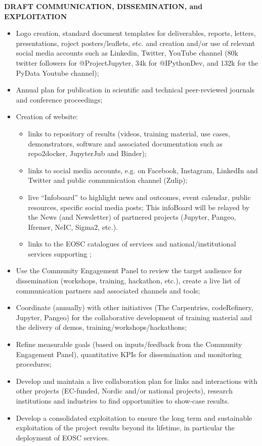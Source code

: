 \begin{framed}

  \centerline{\textbf{ \TheProject DRAFT COMMUNICATION, DISSEMINATION, and EXPLOITATION}}
  {
  \begin{itemize}

\item Logo creation, standard document templates for deliverables, reports, letters, presentations, roject posters/leaflets, etc. and creation and/or use of relevant social media accounts such as Linkedin, Twitter, YouTube channel (80k twitter followers for @ProjectJupyter, 34k for @IPythonDev, and 132k for the PyData Youtube channel);
\item Annual plan for publication in scientific and technical peer-reviewed journals and conference proceedings;
\item Creation of \TheProject website:
\begin{itemize}
\item links to \TheProject repository of results (videos, training material, use cases, demonstrators, software and associated documentation such as repo2docker, JupyterJub and Binder);
\item links to social media accounts, e.g. on Facebook, Instagram, LinkedIn and Twitter and public communication channel (Zulip);
\item live “Infoboard” to highlight news and outcomes, event calendar, public resources, specific social media posts; This infoBoard will be relayed by the News (and Newsletter) of partnered projects (Jupyter, Pangeo, Ifremer, NeIC, Sigma2, etc.).
\item links to the EOSC catalogues of services and national/institutional services supporting \TheProject;
\end{itemize}
\item Use the Community Engagement Panel to review the target audience for dissemination (workshops, training, hackathon, etc.), create a live list of communication partners and associated channels and tools;
\item Coordinate (annually) with other initiatives (The Carpentries, codeRefinery, Jupyter, Pangeo) for the collaborative development of training material and the delivery of demos, training/workshops/hackathons;
\item Refine measurable goals (based on inputs/feedback from the Community
  Engagement Panel), quantitative KPIs for dissemination and monitoring procedures;
\item Develop and maintain a live collaboration plan for links and interactions with other projects (EC-funded, Nordic and/or national projects), research institutions and industries to find opportunities to show-case \TheProject results.
\item Develop a consolidated exploitation to ensure the long term and sustainable exploitation of the project results beyond its lifetime, in particular the deployment of EOSC services.
    \end{itemize}
}
\end{framed}

